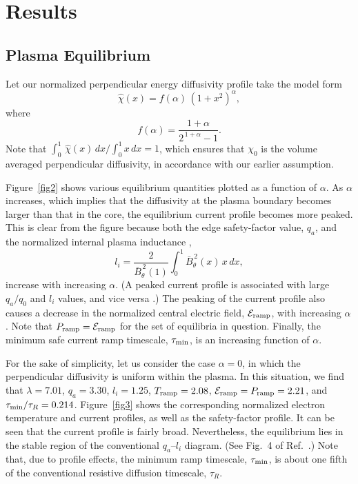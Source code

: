 \documentclass{iopjournal}
\begin{document}
\section{Results}
\subsection{Plasma Equilibrium}\label{equilb}
Let our normalized perpendicular energy diffusivity profile take the model form
\begin{equation}
\hat{\chi}(x) = f(\alpha)\,(1+x^2)^\alpha,
\end{equation}
where
\begin{equation}
f(\alpha) = \frac{1+\alpha}{2^{\,1+\alpha}-1}.
\end{equation}
Note that $\int_0^1\,\hat{\chi}(x)\,dx/\int_0^1x\,dx=1$, which ensures that $\chi_0$ is the volume averaged perpendicular diffusivity, in accordance with our earlier assumption. 

Figure~\ref{fig2} shows various equilibrium quantities plotted as a function of $\alpha$. As $\alpha$ increases, which implies that the diffusivity at the plasma
boundary becomes larger than that in the core, the equilibrium current profile becomes more peaked. This is clear from the figure because both the edge safety-factor
value, $q_a$, and the normalized internal plasma inductance \cite{cheng}, 
\begin{equation}
l_i= \frac{2}{\bar{B}_\theta^{\,2}(1)}\int_0^1\bar{B}_\theta^{\,2}(x)\,x\,dx,
\end{equation}
increase with increasing $\alpha$. (A peaked current profile is associated with  large $q_a/q_0$ and $l_i$ values, and vice versa \cite{wesson,book}.) The peaking of the current profile also causes a decrease in the normalized central electric field, ${\cal E}_{\rm ramp}$,  with increasing $\alpha$. 
Note that $P_{\rm ramp}= {\cal E}_{\rm ramp}$ for the set of equilibria in question. Finally, the minimum safe current ramp timescale, $\tau_{\rm min}$,  is an increasing function of $\alpha$. 

For the sake of simplicity, let us consider the case $\alpha=0$, in which the perpendicular diffusivity is uniform within the plasma. In this situation,
we find that 
$\lambda =  7.01$,  $q_a    =  3.30$,   $l_i   =  1.25$, 
$T_{\rm ramp} =  2.08$,  ${\cal E}_{\rm ramp}=P_{\rm ramp}  =  2.21$, and $\tau_{\rm min}/\tau_R =  0.214$. 
Figure~\ref{fig3} shows the corresponding normalized electron temperature and current profiles, as well as the safety-factor profile. 
It can be seen that the current profile is fairly broad. Nevertheless, the equilibrium lies in the stable region of the
conventional $q_a$--$l_i$ diagram. (See Fig.~4 of Ref.~\cite{cheng}.) Note that, due to profile effects,  the minimum ramp timescale,
$\tau_{\rm min}$,  is about one fifth of the conventional
resistive diffusion timescale, $\tau_R$. 
\end{document}

